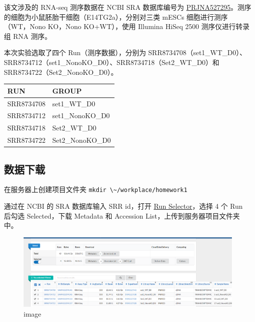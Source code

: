 \documentclass[
  a4paper,
]{article}
\newcommand{\passthrough}[1]{#1}
\begin{document}
该文涉及的 RNA-seq 测序数据在 NCBI SRA 数据库编号为
\href{https://www.ncbi.nlm.nih.gov/bioproject/PRJNA527295}{PRJNA527295}。测序的细胞为小鼠胚胎干细胞（E14TG2a），分别对三类
mESCs 细胞进行测序（WT，Nono KO，Nono KO+WT），使用 Illumina HiSeq 2500
测序仪进行转录组 RNA 测序。

本次实验选取了四个 Run（测序数据），分别为
SRR8734708（set1\_WT\_D0）、SRR8734712（set1\_NonoKO\_D0）、SRR8734718（Set2\_WT\_D0）和
SRR8734722（Set2\_NonoKO\_D0）。

\begin{longtable}[]{@{}ll@{}}
\toprule()
RUN & GROUP \\
\midrule()
\endhead
SRR8734708 & set1\_WT\_D0 \\
SRR8734712 & set1\_NonoKO\_D0 \\
SRR8734718 & Set2\_WT\_D0 \\
SRR8734722 & Set2\_NonoKO\_D0 \\
\bottomrule()
\end{longtable}

\hypertarget{ux6570ux636eux4e0bux8f7d}{%
\subsection{数据下载}\label{ux6570ux636eux4e0bux8f7d}}

在服务器上创建项目文件夹
\passthrough{\lstinline!mkdir \~/workplace/homework1!}\hspace{0pt}

通过在 NCBI 的 SRA 数据库输入 SRR id，打开
\href{https://www.ncbi.nlm.nih.gov/Traces/study/?acc=SRP188551\&o=acc_s\%3Aa\&s=SRR8734722,SRR8734718,SRR8734708,SRR8734712}{Run
Selector}，选择 4 个 Run 后勾选 Selected，下载 Metadata 和 Accession
List，上传到服务器项目文件夹中。

\begin{figure}

{\centering \includegraphics{assets/image-20220923111615-szjl96s.png}

}

\caption{image}

\end{figure}
\end{document}
